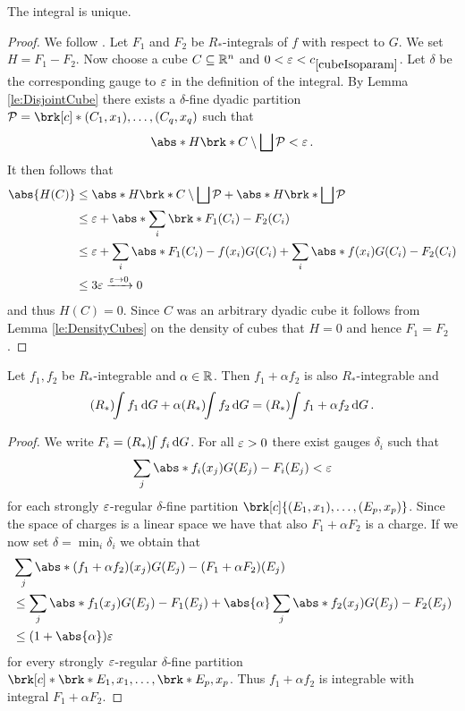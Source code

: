 \begin{claim}
The integral is unique.
\end{claim}
\begin{proof}
We follow \cite[Proposition 3.4]{Pfe2016}. Let $F_1$ and $F_2$ be $R_*$-integrals of $f$ with respect to $G$. We set $H=F_1-F_2$. Now choose a cube $C\subseteq \mathbb{R}^n$ and $0<\e<\useconstant{cubeIsoparam}$. Let $\delta$ be the corresponding gauge to $\varepsilon$ in the definition of the integral. By Lemma \ref{le:DisjointCube} there exists a $\delta$-fine dyadic partition $\cP=\brk[c]*{(C_1,x_1),\dots,(C_q,x_q)}$ such that
\begin{align*}
	\abs*{H\brk*{C\setminus \bigsqcup\cP}}<\e\,.
\end{align*}
It then follows that
\begin{align*}
	\abs{H(C)}
	&\leq \abs*{H\brk*{C\setminus \bigsqcup\cP}}+\abs*{H\brk*{\bigsqcup\cP}} \\
	&\leq\e+\abs*{\sum_i\brk*{F_1(C_i)-F_2(C_i)}} \\
	&\leq \e+\sum_i\abs*{F_1(C_i)-f(x_i)G(C_i)} +\sum_i\abs*{f(x_i)G(C_i)-F_2(C_i)} \\
	&\leq 3\e\xrightarrow{\e\to0}0
\end{align*}
and thus $H(C)=0$. Since $C$ was an arbitrary dyadic cube it follows from 
Lemma \ref{le:DensityCubes} on the density of cubes that $H=0$ and hence $F_1=F_2$.

\end{proof}

\begin{claim}
Let $f_1,f_2$ be $R_*$-integrable and $\alpha\in\mathbb{R}$. Then $f_1+\alpha f_2$ is also $R_*$-integrable and
\begin{align*}
	(R_*)\!\!\int f_1\,\mathrm{d} G + \alpha(R_*)\!\!\int f_2\,\mathrm{d} G=(R_*)\!\!\int f_1+\alpha f_2\,\mathrm{d} G\,.
\end{align*}
\end{claim}

\begin{proof}
We write $F_i=(R_*)\!\!\int f_i\,\mathrm{d} G$. For all $\varepsilon>0$ there exist gauges $\delta_i$ such that
\begin{align*}
	\sum_j\abs*{f_i(x_j)G(E_j)-F_i(E_j)}<\e
\end{align*}
for each strongly $\varepsilon$-regular $\delta$-fine partition $\brk[c]{(E_1,x_1),\dots,(E_p,x_p)}$. Since the space of charges is a linear space we have that also $F_1+\alpha F_2$ is a charge.
If we now set $\delta=\min_i\delta_i$ we obtain that
\begin{align*}
	&\sum_j\abs*{(f_1+\alpha f_2)(x_j)G(E_j)-(F_1+\alpha F_2)(E_j)} \\
	&\leq \sum_j\abs*{f_1(x_j)G(E_j)-F_1(E_j)}+\abs{\alpha}\sum_j\abs*{f_2(x_j)G(E_j)-F_2(E_j)} \\
	&\leq (1+\abs{\alpha})\e
\end{align*}
for every strongly $\varepsilon$-regular $\delta$-fine partition $\brk[c]*{\brk*{E_1,x_1},\dots,\brk*{E_p,x_p}}$. Thus $f_1+\alpha f_2$ is integrable with integral $F_1+\alpha F_2$.
\end{proof}


